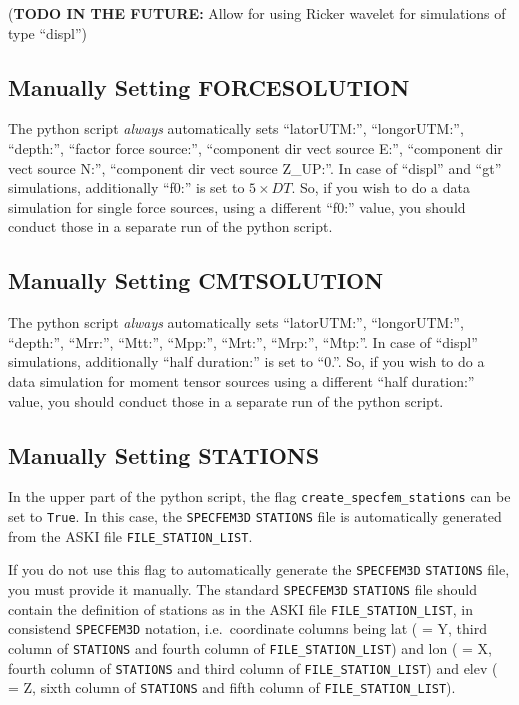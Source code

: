 \documentclass[12pt,a4paper]{article}
\newcommand{\lcode}[1]{\nolinkurl{#1}}
\newcommand{\lcodetitle}[1]{ {\ttfamily #1} }
\newcommand{\ASKI}{ {\ttfamily ASKI} }
\begin{document}
({\bf TODO IN THE FUTURE:} Allow for using Ricker wavelet for simulations of type ``displ'')

%
\subsection{Manually Setting \lcodetitle{FORCESOLUTION}}
%
The python script \emph{always} automatically sets ``latorUTM:'', ``longorUTM:'', ``depth:'', 
``factor force source:'', ``component dir vect source E:'', ``component dir vect source N:'', 
``component dir vect source Z\_UP:''. In case of ``displ'' and ``gt'' simulations, additionally ``f0:'' 
is set to $5\times DT$.
So, if you wish to do a data simulation for single force sources, using a different ``f0:'' value, you 
should conduct those in a separate run of the python script.
%
\subsection{Manually Setting \lcodetitle{CMTSOLUTION}}
%
The python script \emph{always} automatically sets ``latorUTM:'', ``longorUTM:'', ``depth:'', 
``Mrr:'', ``Mtt:'', ``Mpp:'', ``Mrt:'', ``Mrp:'', ``Mtp:''. In case of ``displ'' simulations, additionally 
``half duration:'' is set to ``0.''. So, if you wish to do a data simulation for moment tensor sources 
using a different ``half duration:'' value, you should conduct those in a separate run of the python script.
%
\subsection{Manually Setting \lcodetitle{STATIONS}}
%
In the upper part of the python script, the flag \lcode{create_specfem_stations} can be set to \lcode{True}.
In this case, the \lcode{SPECFEM3D} \lcode{STATIONS} file is automatically generated from the 
\ASKI file \lcode{FILE_STATION_LIST}.

If you do not use this flag to automatically generate the \lcode{SPECFEM3D} \lcode{STATIONS} file,
you must provide it manually.
The standard \lcode{SPECFEM3D} \lcode{STATIONS} file should contain the definition of stations as
in the \ASKI file \lcode{FILE_STATION_LIST}, in consistend \lcode{SPECFEM3D} notation, i.e.\ coordinate
columns being lat ( = Y, third column of \lcode{STATIONS} and fourth column of \lcode{FILE_STATION_LIST}) and 
lon ( = X, fourth column of \lcode{STATIONS} and third column of \lcode{FILE_STATION_LIST}) and 
elev ( = Z, sixth column of \lcode{STATIONS} and fifth column of \lcode{FILE_STATION_LIST}). 
\end{document}
